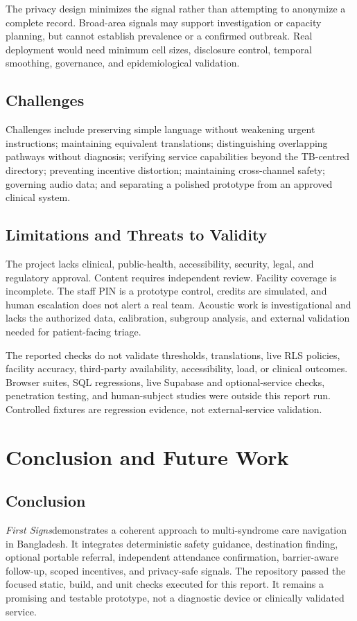 \documentclass[12pt,onecolumn]{IEEEtran}
\newcommand{\product}{\textit{First Signs}}
\begin{document}
The privacy design minimizes the signal rather than attempting to anonymize a complete record. Broad-area signals may support investigation or capacity planning, but cannot establish prevalence or a confirmed outbreak. Real deployment would need minimum cell sizes, disclosure control, temporal smoothing, governance, and epidemiological validation.

\subsection{Challenges}
Challenges include preserving simple language without weakening urgent instructions; maintaining equivalent translations; distinguishing overlapping pathways without diagnosis; verifying service capabilities beyond the TB-centred directory; preventing incentive distortion; maintaining cross-channel safety; governing audio data; and separating a polished prototype from an approved clinical system.

\subsection{Limitations and Threats to Validity}
The project lacks clinical, public-health, accessibility, security, legal, and regulatory approval. Content requires independent review. Facility coverage is incomplete. The staff PIN is a prototype control, credits are simulated, and human escalation does not alert a real team. Acoustic work is investigational and lacks the authorized data, calibration, subgroup analysis, and external validation needed for patient-facing triage.

The reported checks do not validate thresholds, translations, live RLS policies, facility accuracy, third-party availability, accessibility, load, or clinical outcomes. Browser suites, SQL regressions, live Supabase and optional-service checks, penetration testing, and human-subject studies were outside this report run. Controlled fixtures are regression evidence, not external-service validation.

\section{Conclusion and Future Work}
\subsection{Conclusion}
\product demonstrates a coherent approach to multi-syndrome care navigation in Bangladesh. It integrates deterministic safety guidance, destination finding, optional portable referral, independent attendance confirmation, barrier-aware follow-up, scoped incentives, and privacy-safe signals. The repository passed the focused static, build, and unit checks executed for this report. It remains a promising and testable prototype, not a diagnostic device or clinically validated service.
\end{document}
